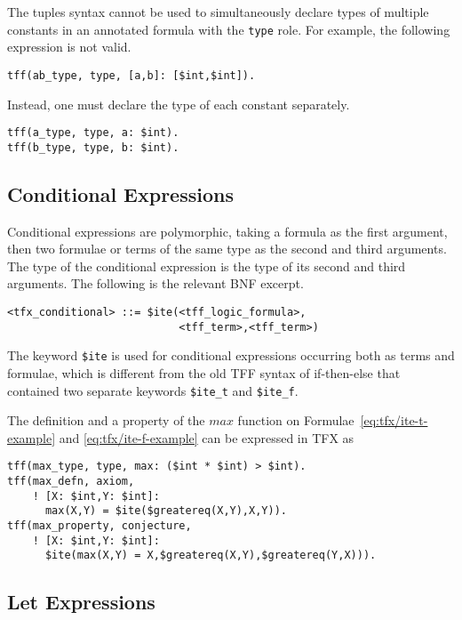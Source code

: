 The tuples syntax cannot be used to simultaneously declare types of multiple constants in an annotated formula with the \verb'type' role. For example, the following expression is not valid.
\begin{verbatim}
tff(ab_type, type, [a,b]: [$int,$int]).
\end{verbatim}
Instead, one must declare the type of each constant separately.
\begin{verbatim}
tff(a_type, type, a: $int).
tff(b_type, type, b: $int).
\end{verbatim}

\subsection{Conditional Expressions}

Conditional expressions are polymorphic, taking a formula as the first 
argument, then two formulae or terms of the same type as the second and 
third arguments. 
The type of the conditional expression is the type of its second and third 
arguments. 
The following is the relevant BNF excerpt.
\begin{verbatim}
<tfx_conditional> ::= $ite(<tff_logic_formula>,
                           <tff_term>,<tff_term>)
\end{verbatim}

The keyword \verb'$ite' is used for conditional expressions occurring both as
terms and formulae, which is different from the old TFF syntax of if-then-else
that contained two separate keywords \verb'$ite_t' and \verb'$ite_f'.

The definition and a property of the $\mathit{max}$ function on Formulae~\ref{eq:tfx/ite-t-example} and \ref{eq:tfx/ite-f-example} can be expressed in
TFX as
\begin{verbatim}
tff(max_type, type, max: ($int * $int) > $int).
tff(max_defn, axiom,
    ! [X: $int,Y: $int]:
      max(X,Y) = $ite($greatereq(X,Y),X,Y)).
tff(max_property, conjecture,
    ! [X: $int,Y: $int]: 
      $ite(max(X,Y) = X,$greatereq(X,Y),$greatereq(Y,X))).
\end{verbatim}

\subsection{Let Expressions}

